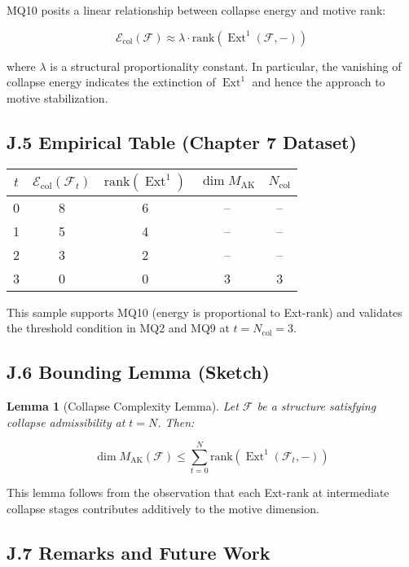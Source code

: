 \documentclass[11pt]{article}
\newtheorem{lemma}[theorem]{Lemma}
\DeclareMathOperator{\Ext}{Ext}
\begin{document}
MQ10 posits a linear relationship between collapse energy and motive rank:

\[
\mathcal{E}_{\mathrm{col}}(\mathcal{F}) \approx \lambda \cdot \mathrm{rank}(\Ext^1(\mathcal{F}, -))
\]

where $\lambda$ is a structural proportionality constant. In particular, the vanishing of collapse energy indicates the extinction of $\Ext^1$ and hence the approach to motive stabilization.

\subsection*{J.5 Empirical Table (Chapter 7 Dataset)}

\begin{center}
\begin{tabular}{|c|c|c|c|c|}
\hline
$t$ & $\mathcal{E}_{\mathrm{col}}(\mathcal{F}_t)$ & $\mathrm{rank}(\Ext^1)$ & $\dim M_{\mathrm{AK}}$ & $N_{\mathrm{col}}$ \\
\hline
0 & 8 & 6 & – & – \\
1 & 5 & 4 & – & – \\
2 & 3 & 2 & – & – \\
3 & 0 & 0 & 3 & 3 \\
\hline
\end{tabular}
\end{center}

This sample supports MQ10 (energy is proportional to Ext-rank) and validates the threshold condition in MQ2 and MQ9 at $t = N_{\mathrm{col}} = 3$.

\subsection*{J.6 Bounding Lemma (Sketch)}

\begin{lemma}[Collapse Complexity Lemma]
Let $\mathcal{F}$ be a structure satisfying collapse admissibility at $t = N$. Then:

\[
\dim M_{\mathrm{AK}}(\mathcal{F}) \leq \sum_{t=0}^{N} \mathrm{rank}(\Ext^1(\mathcal{F}_t, -))
\]
\end{lemma}

This lemma follows from the observation that each Ext-rank at intermediate collapse stages contributes additively to the motive dimension.

\subsection*{J.7 Remarks and Future Work}
\end{document}
